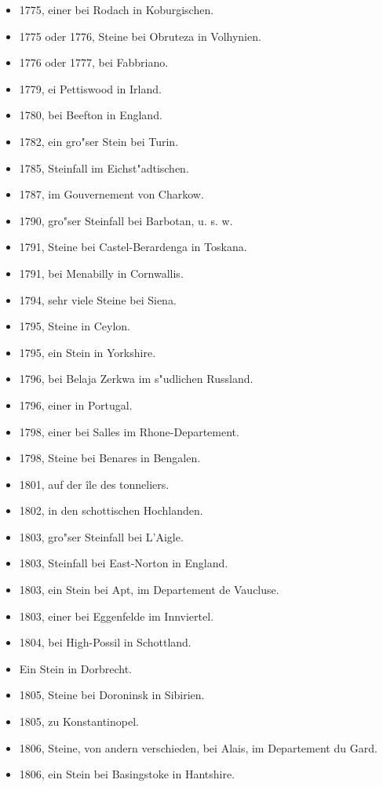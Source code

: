 \documentclass[a4paper, 11pt, oneside, polutonikogreek, german]{article}
\begin{document}
\begin{itemize}
    \item 1775, einer bei Rodach in Koburgischen.
    \item 1775 oder 1776, Steine bei Obruteza in Volhynien.
    \item 1776 oder 1777, bei Fabbriano.
    \item 1779, ei Pettiswood in Irland.
    \item 1780, bei Beefton in England.
    \item 1782, ein gro"ser Stein bei Turin.
    \item 1785, Steinfall im Eichst"adtischen.
    \item 1787, im Gouvernement von Charkow.
    \item 1790, gro"ser Steinfall bei Barbotan, u. s. w.
    \item 1791, Steine bei Castel-Berardenga in Toskana.
    \item 1791, bei Menabilly in Cornwallis.
    \item 1794, sehr viele Steine bei Siena.
    \item 1795, Steine in Ceylon.
    \item 1795, ein Stein in Yorkshire.
    \item 1796, bei Belaja Zerkwa im s"udlichen Russland.
    \item 1796, einer in Portugal.
    \item 1798, einer bei Salles im Rhone-Departement.
    \item 1798, Steine bei Benares in Bengalen.
    \item 1801, auf der île des tonneliers.
    \item 1802, in den schottischen Hochlanden.
    \item 1803, gro"ser Steinfall bei L'Aigle.
    \item 1803, Steinfall bei East-Norton in England.
    \item 1803, ein Stein bei Apt, im Departement de Vaucluse.
    \item 1803, einer bei Eggenfelde im Innviertel.
    \item 1804, bei High-Possil in Schottland.
    \item Ein Stein in Dorbrecht.
    \item 1805, Steine bei Doroninsk in Sibirien.
    \item 1805, zu Konstantinopel.
    \item 1806, Steine, von andern verschieden, bei Alais, im Departement du Gard.
    \item 1806, ein Stein bei Basingstoke in Hantshire.

\end{itemize}
\end{document}
